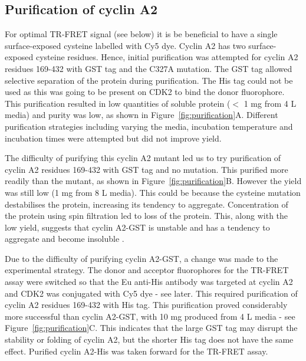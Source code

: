 \subsection{Purification of cyclin A2}

For optimal TR-FRET signal (see below) it is be beneficial to have a single surface-exposed cysteine labelled with Cy5 dye.
Cyclin A2 has two surface-exposed cysteine residues.
Hence, initial purification was attempted for cyclin A2 residues 169-432 with GST tag and the C327A mutation.
The GST tag allowed selective separation of the protein during purification.
The His tag could not be used as this was going to be present on CDK2 to bind the donor fluorophore.
This purification resulted in low quantities of soluble protein ($<$ 1 mg from 4 L media) and purity was low, as shown in Figure~\ref{fig:purification}A.
Different purification strategies including varying the media, incubation temperature and incubation times were attempted but did not improve yield.

The difficulty of purifying this cyclin A2 mutant led us to try purification of cyclin A2 residues 169-432 with GST tag and no mutation.
This purified more readily than the mutant, as shown in Figure~\ref{fig:purification}B.
However the yield was still low (1 mg from 8 L media).
This could be because the cysteine mutation destabilises the protein, increasing its tendency to aggregate.
Concentration of the protein using spin filtration led to loss of the protein.
This, along with the low yield, suggests that cyclin A2-GST is unstable and has a tendency to aggregate and become insoluble \cite{Brown2015}.

Due to the difficulty of purifying cyclin A2-GST, a change was made to the experimental strategy.
The donor and acceptor fluorophores for the TR-FRET assay were switched so that the Eu anti-His antibody was targeted at cyclin A2 and CDK2 was conjugated with Cy5 dye - see later.
This required purification of cyclin A2 residues 169-432 with His tag.
This purification proved considerably more successful than cyclin A2-GST, with 10 mg produced from 4 L media - see Figure~\ref{fig:purification}C.
This indicates that the large GST tag may disrupt the stability or folding of cyclin A2, but the shorter His tag does not have the same effect.
Purified cyclin A2-His was taken forward for the TR-FRET assay.



